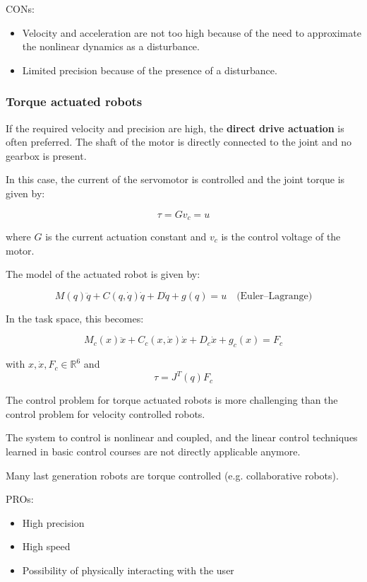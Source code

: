 CONs:
\begin{itemize}
    \item Velocity and acceleration are not too high because of the need to approximate the nonlinear dynamics as a disturbance.  
    \item Limited precision because of the presence of a disturbance.  
\end{itemize}

\hfill

\subsubsection*{Torque actuated robots}

If the required velocity and precision are high, the \textbf{direct drive actuation} is often preferred. The shaft of the motor is directly connected to the joint and no gearbox is present.

In this case, the current of the servomotor is controlled and the joint torque is given by:

\[
\tau = G v_c = u
\]

where $G$ is the current actuation constant and $v_c$ is the control voltage of the motor.

The model of the actuated robot is given by:

\[
M(q)\ddot{q} + C(q,\dot{q})\dot{q} + D\dot{q} + g(q) = u 
\quad \text{(Euler–Lagrange)}
\]

In the task space, this becomes:

\[
M_c(x)\ddot{x} + C_c(x,\dot{x})\dot{x} + D_c\dot{x} + g_c(x) = F_c
\]

with $x, \dot{x}, F_c \in \mathbb{R}^6$ and 
\[
\tau = J^T(q)F_c
\]

The control problem for torque actuated robots is more challenging than the control problem for velocity controlled robots.  

The system to control is nonlinear and coupled, and the linear control techniques learned in basic control courses are not directly applicable anymore.  

\hfill

Many last generation robots are torque controlled (e.g. collaborative robots).  

PROs:
\begin{itemize}
    \item High precision  
    \item High speed  
    \item Possibility of physically interacting with the user  
\end{itemize}

